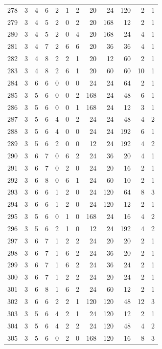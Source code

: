 \documentclass[11pt,a4paper]{article}
\begin{document}
\begin{longtable}{r|rrr|rrr|rrr|rr}
278 & 3 & 4 & 6 & 2 & 1 & 2 & 20 & 24 & 120 & 2 & 1\\
279 & 3 & 4 & 5 & 2 & 0 & 2 & 20 & 168 & 12 & 2 & 1\\
280 & 3 & 4 & 5 & 2 & 0 & 4 & 20 & 168 & 24 & 4 & 1\\
281 & 3 & 4 & 7 & 2 & 6 & 6 & 20 & 36 & 36 & 4 & 1\\
282 & 3 & 4 & 8 & 2 & 2 & 1 & 20 & 12 & 60 & 2 & 1\\
283 & 3 & 4 & 8 & 2 & 6 & 1 & 20 & 60 & 60 & 10 & 1\\
284 & 3 & 6 & 6 & 0 & 0 & 0 & 24 & 24 & 64 & 2 & 1\\
285 & 3 & 5 & 6 & 0 & 0 & 2 & 168 & 24 & 48 & 6 & 1\\
286 & 3 & 5 & 6 & 0 & 0 & 1 & 168 & 24 & 12 & 3 & 1\\
287 & 3 & 5 & 6 & 4 & 0 & 2 & 24 & 24 & 48 & 4 & 2\\
288 & 3 & 5 & 6 & 4 & 0 & 0 & 24 & 24 & 192 & 6 & 1\\
289 & 3 & 5 & 6 & 2 & 0 & 0 & 12 & 24 & 192 & 4 & 2\\
290 & 3 & 6 & 7 & 0 & 6 & 2 & 24 & 36 & 20 & 4 & 1\\
291 & 3 & 6 & 7 & 0 & 2 & 0 & 24 & 20 & 16 & 2 & 1\\
292 & 3 & 6 & 8 & 0 & 6 & 1 & 24 & 60 & 10 & 2 & 1\\
293 & 3 & 6 & 6 & 1 & 2 & 0 & 24 & 120 & 64 & 8 & 3\\
294 & 3 & 6 & 6 & 1 & 2 & 0 & 24 & 120 & 12 & 2 & 1\\
295 & 3 & 5 & 6 & 0 & 1 & 0 & 168 & 24 & 16 & 4 & 2\\
296 & 3 & 5 & 6 & 2 & 1 & 0 & 12 & 24 & 192 & 4 & 2\\
297 & 3 & 6 & 7 & 1 & 2 & 2 & 24 & 20 & 20 & 2 & 1\\
298 & 3 & 6 & 7 & 1 & 6 & 2 & 24 & 36 & 20 & 2 & 1\\
299 & 3 & 6 & 7 & 1 & 6 & 2 & 24 & 36 & 24 & 2 & 1\\
300 & 3 & 6 & 7 & 1 & 2 & 2 & 24 & 20 & 24 & 2 & 1\\
301 & 3 & 6 & 8 & 1 & 6 & 2 & 24 & 60 & 12 & 2 & 1\\
302 & 3 & 6 & 6 & 2 & 2 & 1 & 120 & 120 & 48 & 12 & 3\\
303 & 3 & 5 & 6 & 4 & 2 & 1 & 24 & 120 & 12 & 2 & 1\\
304 & 3 & 5 & 6 & 4 & 2 & 2 & 24 & 120 & 48 & 4 & 2\\
305 & 3 & 5 & 6 & 0 & 2 & 0 & 168 & 120 & 16 & 8 & 3\\

\end{longtable}
\end{document}
